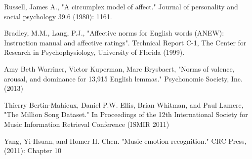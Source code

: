 \documentclass[10pt,journal,compsoc]{IEEEtran}
\begin{document}
\begin{thebibliography}{30}
  Russell, James A., "A circumplex model of affect." Journal of personality and social psychology 39.6 (1980): 1161.
  
  Bradley, M.M., Lang, P.J., "Affective norms for English words (ANEW): Instruction manual and affective ratings". Technical Report C-1, The Center for Research in Psychophysiology, University of Florida (1999).
  
  Amy Beth Warriner, Victor Kuperman, Marc Brysbaert, "Norms of valence, arousal, and dominance for 13,915 English lemmas." Psychonomic Society, Inc. (2013)
  
  Thierry Bertin-Mahieux, Daniel P.W. Ellis, Brian Whitman, and Paul Lamere, "The Million Song Dataset." In Proceedings of the 12th International Society for Music Information Retrieval Conference (ISMIR 2011)
  
  Yang, Yi-Hsuan, and Homer H. Chen. "Music emotion recognition." CRC Press, (2011): Chapter 10
  


\end{thebibliography}

% 







\end{document}
